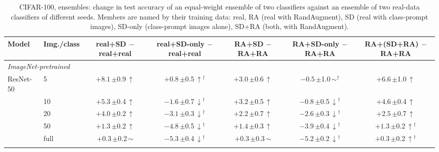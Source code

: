 \begin{table}[htbp]
\centering
\footnotesize
\setlength{\tabcolsep}{4pt}
\caption{CIFAR-100, ensembles: change in test accuracy of an equal-weight ensemble of two classifiers against an ensemble of two real-data classifiers of different seeds. Members are named by their training data: real, RA (real with RandAugment), SD (real with class-prompt images), SD-only (class-prompt images alone), SD+RA (both, with RandAugment).}
\label{tab:paper-ensemble}
\begin{tabular}{llccccc}
\toprule
Model & Img./class & \shortstack{real+SD\\$-$real+real} & \shortstack{real+SD-only\\$-$real+real} & \shortstack{RA+SD\\$-$RA+RA} & \shortstack{RA+SD-only\\$-$RA+RA} & \shortstack{RA+(SD+RA)\\$-$RA+RA} \\
\midrule
\multicolumn{7}{l}{\textit{ImageNet-pretrained}} \\
ResNet-50 & 5 & $+8.1$\,{\scriptsize$\pm$0.9}\,$\uparrow$ & $+0.8$\,{\scriptsize$\pm$0.5}\,$\uparrow$$^\dagger$ & $+3.0$\,{\scriptsize$\pm$0.6}\,$\uparrow$ & $-0.5$\,{\scriptsize$\pm$1.0}\,$\sim$$^\dagger$ & $+6.6$\,{\scriptsize$\pm$1.0}\,$\uparrow$ \\
 & 10 & $+5.3$\,{\scriptsize$\pm$0.4}\,$\uparrow$ & $-1.6$\,{\scriptsize$\pm$0.7}\,$\downarrow$$^\dagger$ & $+3.2$\,{\scriptsize$\pm$0.5}\,$\uparrow$ & $-0.8$\,{\scriptsize$\pm$0.5}\,$\downarrow$$^\dagger$ & $+4.6$\,{\scriptsize$\pm$0.4}\,$\uparrow$ \\
 & 20 & $+4.0$\,{\scriptsize$\pm$0.2}\,$\uparrow$ & $-3.1$\,{\scriptsize$\pm$0.3}\,$\downarrow$$^\dagger$ & $+2.2$\,{\scriptsize$\pm$0.7}\,$\uparrow$ & $-2.6$\,{\scriptsize$\pm$0.3}\,$\downarrow$$^\dagger$ & $+2.5$\,{\scriptsize$\pm$0.7}\,$\uparrow$ \\
 & 50 & $+1.3$\,{\scriptsize$\pm$0.2}\,$\uparrow$ & $-4.8$\,{\scriptsize$\pm$0.5}\,$\downarrow$$^\dagger$ & $+1.4$\,{\scriptsize$\pm$0.3}\,$\uparrow$ & $-3.9$\,{\scriptsize$\pm$0.4}\,$\downarrow$$^\dagger$ & $+1.3$\,{\scriptsize$\pm$0.2}\,$\uparrow$$^\dagger$ \\
 & full & $+0.3$\,{\scriptsize$\pm$0.2}\,$\sim$ & $-5.3$\,{\scriptsize$\pm$0.4}\,$\downarrow$$^\dagger$ & $+0.3$\,{\scriptsize$\pm$0.3}\,$\sim$ & $-5.2$\,{\scriptsize$\pm$0.2}\,$\downarrow$$^\dagger$ & $+0.3$\,{\scriptsize$\pm$0.2}\,$\uparrow$$^\dagger$ \\
\addlinespace[2pt]

\end{tabular}
\end{table}
